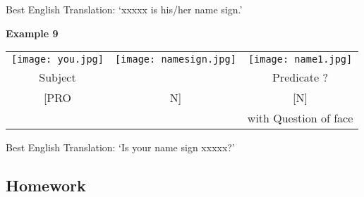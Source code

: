 \documentclass{tufte-book}
\begin{document}
Best English Translation: `xxxxx is his/her name sign.'

\vspace{0.25cm} \noindent \textbf{Example 9}
\begin{table*}[h!]

\begin{tabular}{c c | c}
\texttt{[image: you.jpg]} & \texttt{[image: namesign.jpg]} &\texttt{[image: name1.jpg]} \\
\footnotesize Subject & &  \footnotesize Predicate  ? \\
\footnotesize [PRO & \footnotesize N] & \footnotesize [N] \\
& & \footnotesize with Question of face\\



\end{tabular}
\end{table*}

Best English Translation: `Is your name sign xxxxx?'

\subsection{Homework}
\end{document}
